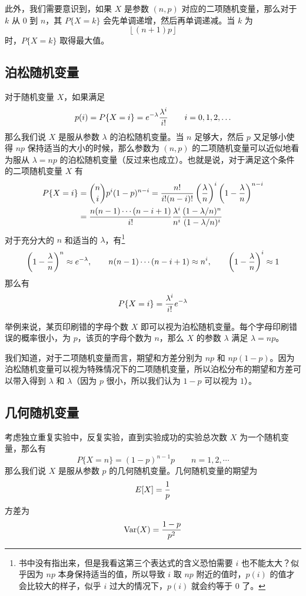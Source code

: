 \documentclass[utf8,a4paper,nofonts,9pt]{ctexbook}
\begin{document}
此外，我们需要意识到，如果 $X$ 是参数 $(n, p)$ 对应的二项随机变量，那么对于 $k$ 从 $0$ 到 $n$，其 $P\{ X = k \}$ 会先单调递增，然后再单调递减。当 $k$ 为
\[
    \left\lfloor (n + 1) p \right\rfloor
\]
时，$P\{X = k\}$ 取得最大值。

\subsection{泊松随机变量}

对于随机变量 $X$，如果满足
\[
    p(i) = P\{X = i\} = e^{-\lambda} {\lambda^i \over i!} \qquad i = 0, 1, 2, \ldots
\]
那么我们说 $X$ 是服从参数 $\lambda$ 的泊松随机变量。当 $n$ 足够大，然后 $p$ 又足够小使得 $np$ 保持适当的大小的时候，那么参数为 $(n, p)$ 的二项随机变量可以近似地看为服从 $\lambda = np$ 的泊松随机变量（反过来也成立）。也就是说，对于满足这个条件的二项随机变量 $X$ 有
\begin{align*}
    P\{X = i\} & = {n \choose i} p^i (1 - p)^{n - i} = {n! \over i! (n - i)!} \left( {\lambda \over n} \right)^i \left( 1 - {\lambda \over n} \right)^{n - i} \\
               & = {n (n - 1) \cdots (n - i + 1) \over i!} {\lambda^i \over n^i} {(1 - \lambda / n)^n \over (1 - \lambda / n)^i}
\end{align*}
对于充分大的 $n$ 和适当的 $\lambda$，有\footnote{书中没有指出来，但是我看这第三个表达式的含义恐怕需要 $i$ 也不能太大？似乎因为 $np$ 本身保持适当的值，所以导致 $i$ 取 $np$ 附近的值时，$p(i)$ 的值才会比较大的样子，似乎 $i$ 过大的情况下，$p(i)$ 就会约等于 $0$ 了。}
\[
    \left(1 - {\lambda \over n}\right)^n \approx e^{-\lambda}, \qquad n (n - 1) \cdots (n - i + 1) \approx n^i, \qquad \left(1 - {\lambda \over n}\right)^i \approx 1
\]
那么有
\[
    P\{X = i\} = {\lambda^i \over i!} e^{-\lambda}
\]

举例来说，某页印刷错的字母个数 $X$ 即可以视为泊松随机变量。每个字母印刷错误的概率很小，为 $p$，该页的字母个数为 $n$，那么 $X$ 的参数 $\lambda$ 满足 $\lambda = np$。

我们知道，对于二项随机变量而言，期望和方差分别为 $np$ 和 $np(1 - p)$。因为泊松随机变量可以视为特殊情况下的二项随机变量，所以泊松分布的期望和方差可以带入得到 $\lambda$ 和 $\lambda$（因为 $p$ 很小，所以我们认为 $1 - p$ 可以视为 $1$）。


\subsection{几何随机变量}

考虑独立重复实验中，反复实验，直到实验成功的实验总次数 $X$ 为一个随机变量，那么有
\[
    P\{ X = n\} = (1 - p)^{n - 1} p \qquad n = 1, 2, \cdots
\]
那么我们说 $X$ 是服从参数 $p$ 的几何随机变量。几何随机变量的期望为
\[
    E[X] = {1 \over p}
\]
方差为
\[
    \textrm{Var}(X) = {1 - p \over p^2}
\]
\end{document}
